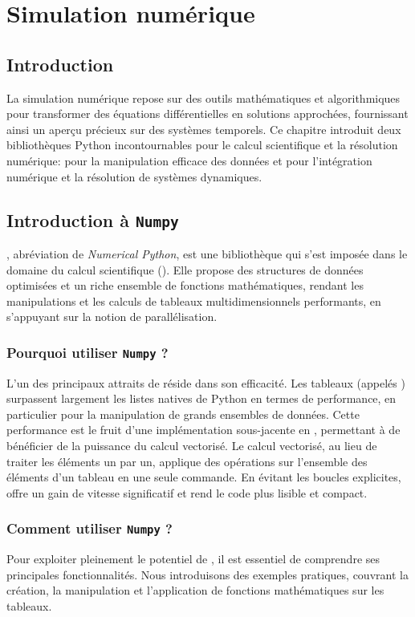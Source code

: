 \chapter{Simulation numérique}

    \section{Introduction}
    La simulation numérique repose sur des outils mathématiques et algorithmiques pour transformer des équations différentielles en solutions approchées, fournissant ainsi un aperçu précieux sur des systèmes temporels. Ce chapitre introduit deux bibliothèques Python incontournables pour le calcul scientifique et la résolution numérique:  pour la manipulation efficace des données et  pour l'intégration numérique et la résolution de systèmes dynamiques.

    \section{Introduction à \texttt{Numpy}}
        , abréviation de \textit{Numerical Python}, est une bibliothèque qui s'est imposée dans le domaine du calcul scientifique (\cite{Numpy2020}). Elle propose des structures de données optimisées et un riche ensemble de fonctions mathématiques, rendant les manipulations et les calculs de tableaux multidimensionnels performants, en s'appuyant sur la notion de parallélisation. 

        \subsection{Pourquoi utiliser \texttt{Numpy} ?}
            L'un des principaux attraits de  réside dans son efficacité. Les tableaux  (appelés ) surpassent largement les listes natives de Python en termes de performance, en particulier pour la manipulation de grands ensembles de données. Cette performance est le fruit d'une implémentation sous-jacente en , permettant à  de bénéficier de la puissance du calcul vectorisé. Le calcul vectorisé, au lieu de traiter les éléments un par un, applique des opérations sur l'ensemble des éléments d'un tableau en une seule commande. En évitant les boucles explicites,  offre un gain de vitesse significatif et rend le code plus lisible et compact.

        \subsection{Comment utiliser \texttt{Numpy} ?}
            Pour exploiter pleinement le potentiel de , il est essentiel de comprendre ses principales fonctionnalités. Nous introduisons des exemples pratiques, couvrant la création, la manipulation et l’application de fonctions mathématiques sur les tableaux.

